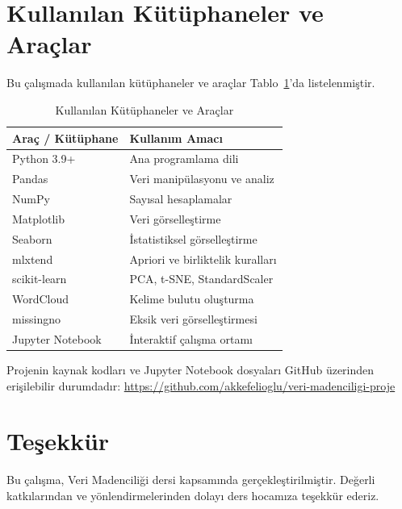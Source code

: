 \documentclass[conference]{IEEEtran}
\begin{document}
\section{Kullanılan Kütüphaneler ve Araçlar}

Bu çalışmada kullanılan kütüphaneler ve araçlar Tablo~\ref{tab:tools}'da listelenmiştir.

\begin{table}[h]
\centering
\caption{Kullanılan Kütüphaneler ve Araçlar}
\label{tab:tools}
\begin{tabular}{ll}
\toprule
\textbf{Araç / Kütüphane} & \textbf{Kullanım Amacı} \\
\midrule
Python 3.9+ & Ana programlama dili \\
Pandas & Veri manipülasyonu ve analiz \\
NumPy & Sayısal hesaplamalar \\
Matplotlib & Veri görselleştirme \\
Seaborn & İstatistiksel görselleştirme \\
mlxtend & Apriori ve birliktelik kuralları \\
scikit-learn & PCA, t-SNE, StandardScaler \\
WordCloud & Kelime bulutu oluşturma \\
missingno & Eksik veri görselleştirmesi \\
Jupyter Notebook & İnteraktif çalışma ortamı \\
\bottomrule
\end{tabular}
\end{table}

Projenin kaynak kodları ve Jupyter Notebook dosyaları GitHub üzerinden erişilebilir durumdadır: \url{https://github.com/akkefelioglu/veri-madenciligi-proje}

\section*{Teşekkür}

Bu çalışma, Veri Madenciliği dersi kapsamında gerçekleştirilmiştir. Değerli katkılarından ve yönlendirmelerinden dolayı ders hocamıza teşekkür ederiz.

\end{document}
